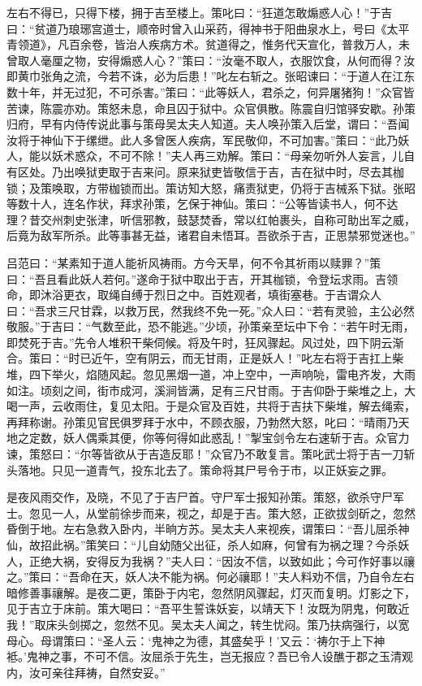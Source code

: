 左右不得已，只得下楼，拥于吉至楼上。策叱曰：“狂道怎敢煽惑人心！”于吉曰：“贫道乃琅琊宫道士，顺帝时曾入山采药，得神书于阳曲泉水上，号曰《太平青领道》，凡百余卷，皆治人疾病方术。贫道得之，惟务代天宣化，普救万人，未曾取人毫厘之物，安得煽惑人心？”策曰：“汝毫不取人，衣服饮食，从何而得？汝即黄巾张角之流，今若不诛，必为后患！”叱左右斩之。张昭谏曰：“于道人在江东数十年，并无过犯，不可杀害。”策曰：“此等妖人，君杀之，何异屠猪狗！”众官皆苦谏，陈震亦劝。策怒未息，命且囚于狱中。众官俱散。陈震自归馆驿安歇。孙策归府，早有内侍传说此事与策母吴太夫人知道。夫人唤孙策入后堂，谓曰：“吾闻汝将于神仙下于缧绁。此人多曾医人疾病，军民敬仰，不可加害。”策曰：“此乃妖人，能以妖术惑众，不可不除！”夫人再三劝解。策曰：“母亲勿听外人妄言，儿自有区处。乃出唤狱吏取于吉来问。原来狱吏皆敬信于吉，吉在狱中时，尽去其枷锁；及策唤取，方带枷锁而出。策访知大怒，痛责狱吏，仍将于吉械系下狱。张昭等数十人，连名作状，拜求孙策，乞保于神仙。策曰：“公等皆读书人，何不达理？昔交州刺史张津，听信邪教，鼓瑟焚香，常以红帕裹头，自称可助出军之威，后竟为敌军所杀。此等事甚无益，诸君自未悟耳。吾欲杀于吉，正思禁邪觉迷也。”

吕范曰：“某素知于道人能祈风祷雨。方今天旱，何不令其祈雨以赎罪？”策曰：“吾且看此妖人若何。”遂命于狱中取出于吉，开其枷锁，令登坛求雨。吉领命，即沐浴更衣，取绳自缚于烈日之中。百姓观者，填街塞巷。于吉谓众人曰：“吾求三尺甘霖，以救万民，然我终不免一死。”众人曰：“若有灵验，主公必然敬服。”于吉曰：“气数至此，恐不能逃。”少顷，孙策亲至坛中下令：“若午时无雨，即焚死于吉。”先令人堆积干柴伺候。将及午时，狂风骤起。风过处，四下阴云渐合。策曰：“时已近午，空有阴云，而无甘雨，正是妖人！”叱左右将于吉扛上柴堆，四下举火，焰随风起。忽见黑烟一道，冲上空中，一声响喨，雷电齐发，大雨如注。顷刻之间，街市成河，溪涧皆满，足有三尺甘雨。于吉仰卧于柴堆之上，大喝一声，云收雨住，复见太阳。于是众官及百姓，共将于吉扶下柴堆，解去绳索，再拜称谢。孙策见官民俱罗拜于水中，不顾衣服，乃勃然大怒，叱曰：“晴雨乃天地之定数，妖人偶乘其便，你等何得如此惑乱！”掣宝剑令左右速斩于吉。众官力谏，策怒曰：“尔等皆欲从于吉造反耶！”众官乃不敢复言。策叱武士将于吉一刀斩头落地。只见一道青气，投东北去了。策命将其尸号令于市，以正妖妄之罪。

是夜风雨交作，及晓，不见了于吉尸首。守尸军士报知孙策。策怒，欲杀守尸军士。忽见一人，从堂前徐步而来，视之，却是于吉。策大怒，正欲拔剑斫之，忽然昏倒于地。左右急救入卧内，半晌方苏。吴太夫人来视疾，谓策曰：“吾儿屈杀神仙，故招此祸。”策笑曰：“儿自幼随父出征，杀人如麻，何曾有为祸之理？今杀妖人，正绝大祸，安得反为我祸？”夫人曰：“因汝不信，以致如此；今可作好事以禳之。”策曰：“吾命在天，妖人决不能为祸。何必禳耶！”夫人料劝不信，乃自令左右暗修善事禳解。是夜二更，策卧于内宅，忽然阴风骤起，灯灭而复明。灯影之下，见于吉立于床前。策大喝曰：“吾平生誓诛妖妄，以靖天下！汝既为阴鬼，何敢近我！”取床头剑掷之，忽然不见。吴太夫人闻之，转生忧闷。策乃扶病强行，以宽母心。母谓策曰：“圣人云：‘鬼神之为德，其盛矣乎！’又云：‘祷尔于上下神袛。’鬼神之事，不可不信。汝屈杀于先生，岂无报应？吾已令人设醮于郡之玉清观内，汝可亲往拜祷，自然安妥。”

